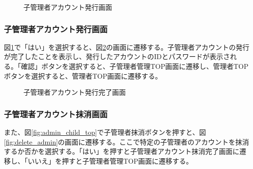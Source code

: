 \documentclass[a4j]{jarticle}
\begin{document}
\begin{figure}[H]
\centering
{}
\caption{子管理者アカウント発行画面}
\label{fig:create_admin}
\end{figure}

\subsubsection{子管理者アカウント発行画面}
図\ref{fig:create_admin}で「はい」を選択すると、図\ref{fig:new_admin}の画面に遷移する。子管理者アカウントの発行が完了したことを表示し、発行したアカウントのIDとパスワードが表示される。「確認」ボタンを選択すると、子管理者管理TOP画面に遷移し、管理者TOPボタンを選択すると、管理者TOP画面に遷移する。

\begin{figure}[H]
\centering
{}
\caption{子管理者アカウント発行完了画面}
\label{fig:new_admin}
\end{figure}

\subsubsection{子管理者アカウント抹消画面}
また、図\ref{fig:admin_child_top}で子管理者抹消ボタンを押すと、図\ref{fig:delete_admin}の画面に遷移する。ここで特定の子管理者のアカウントを抹消するか否かを選択する。「はい」を押すと子管理者アカウント抹消完了画面に遷移し、「いいえ」を押すと子管理者管理TOP画面に遷移する。
\end{document}
